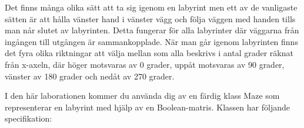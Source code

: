 Det finns många olika sätt att ta sig igenom en labyrint men ett av de vanligaste sätten är att hålla vänster hand i vänster vägg och följa väggen med handen tills man når slutet av labyrinten. Detta fungerar för alla labyrinter där väggarna från ingången till utgången är sammankopplade. När man går igenom labyrinten finns det fyra olika riktningar att välja mellan som alla beskrivs i antal grader räknat från x-axeln, där höger motsvaras av 0 grader, uppåt motsvaras av 90 grader, vänster av 180 grader och nedåt av 270 grader.



I den här laborationen kommer du använda dig av en färdig klass Maze som representerar en labyrint med hjälp av en Boolean-matris. Klassen har följande specifikation:


